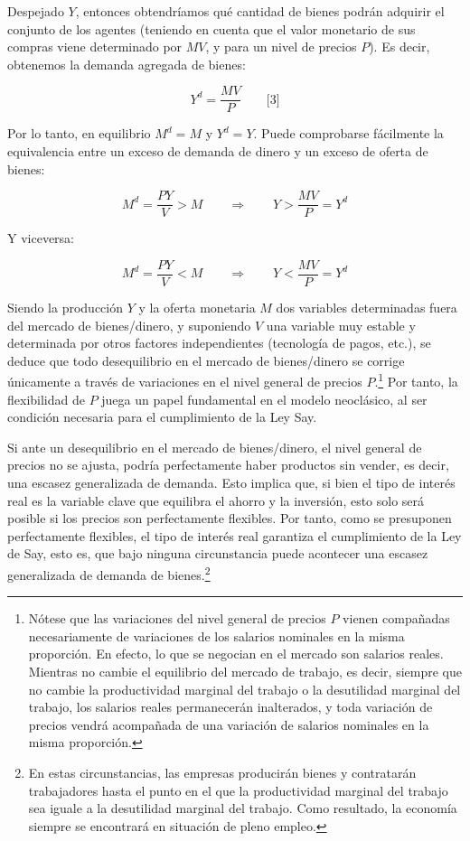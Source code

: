 \documentclass[10pt,a4paper]{article}
\begin{document}
Despejado $Y$, entonces obtendríamos qué cantidad de bienes podrán adquirir el conjunto de los agentes (teniendo en cuenta que el valor monetario de sus compras viene determinado por $MV$, y para un nivel de precios $P$). Es decir, obtenemos la demanda agregada de bienes: 

$$Y^d=\frac{MV}{P}\qquad \text{[3]}$$

Por lo tanto, en equilibrio $M^d = M$ y $Y^d = Y$. Puede comprobarse fácilmente la equivalencia entre un exceso de demanda de dinero y un exceso de oferta de bienes:

$$M^d=\frac{PY}{V}>M\qquad \Longrightarrow\qquad Y>\frac{MV}{P}=Y^d$$

Y viceversa:

$$M^d=\frac{PY}{V}<M\qquad \Longrightarrow\qquad Y<\frac{MV}{P}=Y^d$$

Siendo la producción $Y$ y la oferta monetaria $M$ dos variables determinadas fuera del mercado de bienes/dinero, y suponiendo $V$ una variable muy estable y determinada por otros factores independientes (tecnología de pagos, etc.), se deduce que todo desequilibrio en el mercado de bienes/dinero se corrige únicamente a través de variaciones en el nivel general de precios $P$.\footnote{%
    Nótese que las variaciones del nivel general de precios $P$ vienen compañadas necesariamente de variaciones de los salarios nominales en la misma proporción. En efecto, lo que se negocian en el mercado son salarios reales. Mientras no cambie el equilibrio del mercado de trabajo, es decir, siempre que no cambie la productividad marginal del trabajo o la desutilidad marginal del trabajo, los salarios reales permanecerán inalterados, y toda variación de precios vendrá acompañada de una variación de salarios nominales en la misma proporción.
} Por tanto, la flexibilidad de $P$ juega un papel fundamental en el modelo neoclásico, al ser condición necesaria para el cumplimiento de la Ley Say. 

Si ante un desequilibrio en el mercado de bienes/dinero, el nivel general de precios no se ajusta, podría perfectamente haber productos sin vender, es decir, una escasez generalizada de demanda. Esto implica que, si bien el tipo de interés real es la variable clave que equilibra el ahorro y la inversión, esto solo será posible si los precios son perfectamente flexibles. Por tanto, como se presuponen perfectamente flexibles, el tipo de interés real garantiza el cumplimiento de la Ley de Say, esto es, que bajo ninguna circunstancia puede acontecer una escasez generalizada de demanda de bienes.\footnote{%
    En estas circunstancias, las empresas producirán bienes y contratarán trabajadores hasta el punto en el que la productividad marginal del trabajo sea iguale a la desutilidad marginal del trabajo. Como resultado, la economía siempre se encontrará en situación de pleno empleo.
} 
\end{document}
